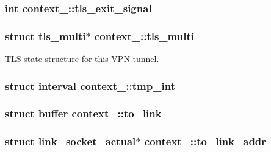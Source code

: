 \subsubsection[{tls\+\_\+exit\+\_\+signal}]{\setlength{\rightskip}{0pt plus 5cm}int context\+\_\+::tls\+\_\+exit\+\_\+signal}\label{structcontext__2_aea6f45bc37c7c473a4ba3871d43ea2d5}
\hypertarget{structcontext__2_a758cf7724377be181e7fab59b7a2a30e}{}
\subsubsection[{tls\+\_\+multi}]{\setlength{\rightskip}{0pt plus 5cm}struct {\bf tls\+\_\+multi}$\ast$ context\+\_\+::tls\+\_\+multi}\label{structcontext__2_a758cf7724377be181e7fab59b7a2a30e}
T\+L\+S state structure for this V\+P\+N tunnel. \hypertarget{structcontext__2_a5fd70b82d77870b98844a107ce3cf7dd}{}
\subsubsection[{tmp\+\_\+int}]{\setlength{\rightskip}{0pt plus 5cm}struct {\bf interval} context\+\_\+::tmp\+\_\+int}\label{structcontext__2_a5fd70b82d77870b98844a107ce3cf7dd}
\hypertarget{structcontext__2_a8b773ace2cf22bd200b316517ac68b9f}{}
\subsubsection[{to\+\_\+link}]{\setlength{\rightskip}{0pt plus 5cm}struct {\bf buffer} context\+\_\+::to\+\_\+link}\label{structcontext__2_a8b773ace2cf22bd200b316517ac68b9f}
\hypertarget{structcontext__2_ab7d4ecafe432890ee5ca789aafec24c2}{}
\subsubsection[{to\+\_\+link\+\_\+addr}]{\setlength{\rightskip}{0pt plus 5cm}struct {\bf link\+\_\+socket\+\_\+actual}$\ast$ context\+\_\+::to\+\_\+link\+\_\+addr}\label{structcontext__2_ab7d4ecafe432890ee5ca789aafec24c2}
\hypertarget{structcontext__2_a913dbf251774ae01f77289e5a4965704}{}
